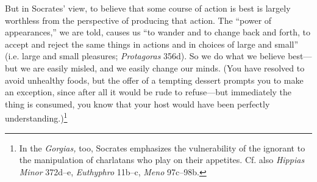 ﻿\documentclass[11pt]{amsart}
\begin{document}





But in Socrates' view, to believe that some course of action is best is largely worthless from the perspective of producing that action. The ``power of appearances,'' we are told, causes us ``to wander and to change back and forth, to accept and reject the same things in actions and in choices of large and small'' (i.e. large and small pleasures; \emph{Protagoras} 356d). So we do what we believe best---but we are easily misled, and we easily change our minds. (You have resolved to avoid unhealthy foods, but the offer of a tempting dessert prompts you to make an exception, since after all it would be rude to refuse---but immediately the thing is consumed, you know that your host would have been perfectly understanding.)\footnote{In the \emph{Gorgias,} too, Socrates emphasizes the vulnerability of the ignorant to the manipulation of charlatans who play on their appetites. Cf. also \emph{Hippias Minor} 372d--e, \emph{Euthyphro} 11b--c, \emph{Meno} 97c--98b.}
 
 
\end{document}
